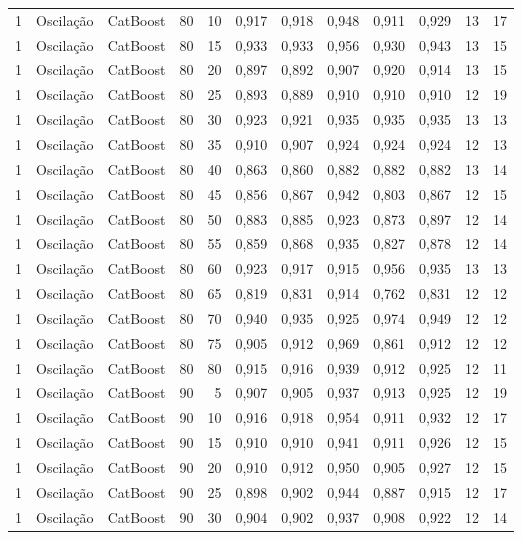 \begin{longtable}{@{}rllrrrrrrrrr@{}}
1 & Oscilação & CatBoost & 80 & 10 & 0,917 & 0,918 & 0,948 & 0,911 & 0,929 & 13 & 17 \\
1 & Oscilação & CatBoost & 80 & 15 & 0,933 & 0,933 & 0,956 & 0,930 & 0,943 & 13 & 15 \\
1 & Oscilação & CatBoost & 80 & 20 & 0,897 & 0,892 & 0,907 & 0,920 & 0,914 & 13 & 15 \\
1 & Oscilação & CatBoost & 80 & 25 & 0,893 & 0,889 & 0,910 & 0,910 & 0,910 & 12 & 19 \\
1 & Oscilação & CatBoost & 80 & 30 & 0,923 & 0,921 & 0,935 & 0,935 & 0,935 & 13 & 13 \\
1 & Oscilação & CatBoost & 80 & 35 & 0,910 & 0,907 & 0,924 & 0,924 & 0,924 & 12 & 13 \\
1 & Oscilação & CatBoost & 80 & 40 & 0,863 & 0,860 & 0,882 & 0,882 & 0,882 & 13 & 14 \\
1 & Oscilação & CatBoost & 80 & 45 & 0,856 & 0,867 & 0,942 & 0,803 & 0,867 & 12 & 15 \\
1 & Oscilação & CatBoost & 80 & 50 & 0,883 & 0,885 & 0,923 & 0,873 & 0,897 & 12 & 14 \\
1 & Oscilação & CatBoost & 80 & 55 & 0,859 & 0,868 & 0,935 & 0,827 & 0,878 & 12 & 14 \\
1 & Oscilação & CatBoost & 80 & 60 & 0,923 & 0,917 & 0,915 & 0,956 & 0,935 & 13 & 13 \\
1 & Oscilação & CatBoost & 80 & 65 & 0,819 & 0,831 & 0,914 & 0,762 & 0,831 & 12 & 12 \\
1 & Oscilação & CatBoost & 80 & 70 & 0,940 & 0,935 & 0,925 & 0,974 & 0,949 & 12 & 12 \\
1 & Oscilação & CatBoost & 80 & 75 & 0,905 & 0,912 & 0,969 & 0,861 & 0,912 & 12 & 12 \\
1 & Oscilação & CatBoost & 80 & 80 & 0,915 & 0,916 & 0,939 & 0,912 & 0,925 & 12 & 11 \\
1 & Oscilação & CatBoost & 90 & 5 & 0,907 & 0,905 & 0,937 & 0,913 & 0,925 & 12 & 19 \\
1 & Oscilação & CatBoost & 90 & 10 & 0,916 & 0,918 & 0,954 & 0,911 & 0,932 & 12 & 17 \\
1 & Oscilação & CatBoost & 90 & 15 & 0,910 & 0,910 & 0,941 & 0,911 & 0,926 & 12 & 15 \\
1 & Oscilação & CatBoost & 90 & 20 & 0,910 & 0,912 & 0,950 & 0,905 & 0,927 & 12 & 15 \\
1 & Oscilação & CatBoost & 90 & 25 & 0,898 & 0,902 & 0,944 & 0,887 & 0,915 & 12 & 17 \\
1 & Oscilação & CatBoost & 90 & 30 & 0,904 & 0,902 & 0,937 & 0,908 & 0,922 & 12 & 14 \\

\end{longtable}
